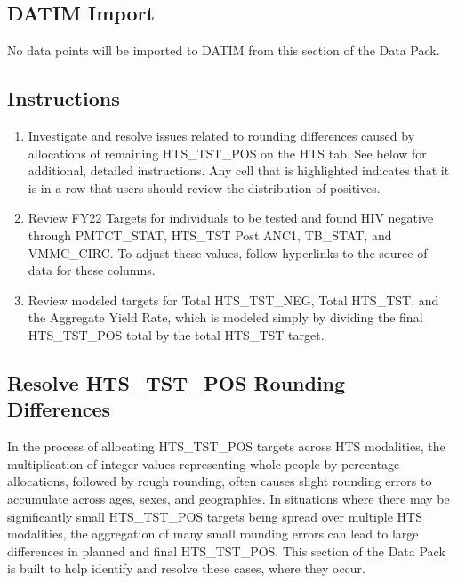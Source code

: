 \documentclass[
  openany]{book}
\begin{document}
\hypertarget{datim-import-28}{%
\subsection{DATIM Import}\label{datim-import-28}}

No data points will be imported to DATIM from this section of the Data
Pack.

\hypertarget{instructions-28}{%
\subsection{Instructions}\label{instructions-28}}

\begin{enumerate}
\def\labelenumi{\arabic{enumi}.}
\item
  Investigate and resolve issues related to rounding differences
  caused by allocations of remaining HTS\_TST\_POS on the HTS tab. See
  below for additional, detailed instructions. Any cell that is
  highlighted indicates that it is in a row that users should review
  the distribution of positives.
\item
  Review FY22 Targets for individuals to be tested and found HIV
  negative through PMTCT\_STAT, HTS\_TST Post ANC1, TB\_STAT, and
  VMMC\_CIRC. To adjust these values, follow hyperlinks to the source
  of data for these columns.
\item
  Review modeled targets for Total HTS\_TST\_NEG, Total HTS\_TST, and the
  Aggregate Yield Rate, which is modeled simply by dividing the final
  HTS\_TST\_POS total by the total HTS\_TST target.
\end{enumerate}

\hypertarget{resolve-hts_tst_pos-rounding-differences}{%
\subsection{Resolve HTS\_TST\_POS Rounding Differences}\label{resolve-hts_tst_pos-rounding-differences}}

In the process of allocating HTS\_TST\_POS targets across HTS modalities,
the multiplication of integer values representing whole people by
percentage allocations, followed by rough rounding, often causes slight
rounding errors to accumulate across ages, sexes, and geographies. In
situations where there may be significantly small HTS\_TST\_POS targets
being spread over multiple HTS modalities, the aggregation of many small
rounding errors can lead to large differences in planned and final
HTS\_TST\_POS. This section of the Data Pack is built to help identify and
resolve these cases, where they occur.
\end{document}
